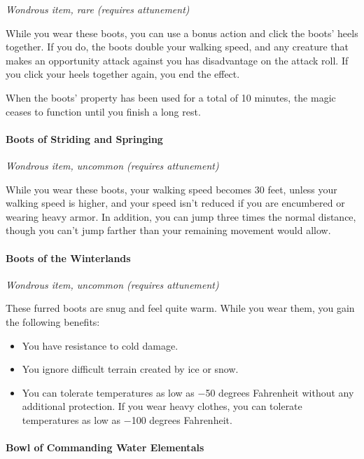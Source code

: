 \documentclass[
]{article}
\providecommand{\tightlist}{%
  \setlength{\itemsep}{0pt}\setlength{\parskip}{0pt}}
\begin{document}
\emph{Wondrous item, rare (requires attunement)}

While you wear these boots, you can use a bonus action and click the
boots' heels together. If you do, the boots double your walking speed,
and any creature that makes an opportunity attack against you has
disadvantage on the attack roll. If you click your heels together again,
you end the effect.

When the boots' property has been used for a total of 10 minutes, the
magic ceases to function until you finish a long rest.

\hypertarget{boots-of-striding-and-springing}{%
\paragraph{Boots of Striding and
Springing}\label{boots-of-striding-and-springing}}

\emph{Wondrous item, uncommon (requires attunement)}

While you wear these boots, your walking speed becomes 30 feet, unless
your walking speed is higher, and your speed isn't reduced if you are
encumbered or wearing heavy armor. In addition, you can jump three times
the normal distance, though you can't jump farther than your remaining
movement would allow.

\hypertarget{boots-of-the-winterlands}{%
\paragraph{Boots of the Winterlands}\label{boots-of-the-winterlands}}

\emph{Wondrous item, uncommon (requires attunement)}

These furred boots are snug and feel quite warm. While you wear them,
you gain the following benefits:

\begin{itemize}
\tightlist
\item
  You have resistance to cold damage.
\item
  You ignore difficult terrain created by ice or snow.
\item
  You can tolerate temperatures as low as −50 degrees Fahrenheit without
  any additional protection. If you wear heavy clothes, you can tolerate
  temperatures as low as −100 degrees Fahrenheit.
\end{itemize}

\hypertarget{bowl-of-commanding-water-elementals}{%
\paragraph{Bowl of Commanding Water
Elementals}\label{bowl-of-commanding-water-elementals}}
\end{document}
